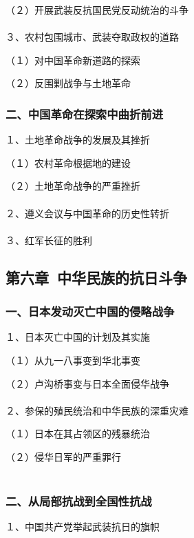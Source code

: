 \documentclass{ctexart}
\begin{document}
（２）开展武装反抗国民党反动统治的斗争
\\\\

３、农村包围城市、武装夺取政权的道路

（１）对中国革命新道路的探索

（２）反围剿战争与土地革命

\subsubsection{二、中国革命在探索中曲折前进}

１、土地革命战争的发展及其挫折

（１）农村革命根据地的建设

（２）土地革命战争的严重挫折
\\\\

２、遵义会议与中国革命的历史性转折
\\\\

３、红军长征的胜利

\subsection{第六章\ 中华民族的抗日斗争}

\subsubsection{一、日本发动灭亡中国的侵略战争}

１、日本灭亡中国的计划及其实施

（１）从九一八事变到华北事变

（２）卢沟桥事变与日本全面侵华战争
\\\\

２、参保的殖民统治和中华民族的深重灾难

（１）日本在其占领区的残暴统治

（２）侵华日军的严重罪行
\\\\

\subsubsection{二、从局部抗战到全国性抗战}

１、中国共产党举起武装抗日的旗帜
\\\\
\end{document}
